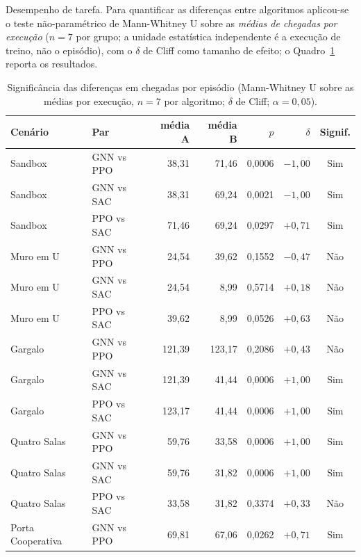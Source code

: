 \documentclass[12pt,reqno, twoside]{amsbook}
\makeatletter
\def\paragraph{\@startsection{paragraph}{4}%
  \z@\z@{-\fontdimen2\font}%
  {\normalfont\bfseries}}
\theoremstyle{plain}
\numberwithin{equation}{chapter}
\numberwithin{section}{chapter}
\numberwithin{table}{chapter}
\numberwithin{figure}{chapter}
\makeatother
\begin{document}
\paragraph{Desempenho de tarefa.} Para quantificar as diferenças entre algoritmos aplicou-se o teste não-paramétrico de Mann-Whitney U sobre as \emph{médias de chegadas por execução} ($n=7$ por grupo; a unidade estatística independente é a execução de treino, não o episódio), com o $\delta$ de Cliff como tamanho de efeito; o Quadro~\ref{tab:res_signif} reporta os resultados.

\begin{table}[!htbp]
\centering
\footnotesize
\caption[Significância das diferenças entre algoritmos]{Significância das diferenças em chegadas por episódio (Mann-Whitney U sobre as médias por execução, $n=7$ por algoritmo; $\delta$ de Cliff; $\alpha = 0{,}05$).}
\label{tab:res_signif}
\renewcommand{\arraystretch}{1.2}
\begin{tabular}{|l|l|r|r|r|r|c|}
\hline
Cenário & Par & média A & média B & $p$ & $\delta$ & Signif. \\
\hline
Sandbox & GNN vs PPO & 38,31 & 71,46 & 0,0006 & $-1{,}00$ & Sim \\
\hline
Sandbox & GNN vs SAC & 38,31 & 69,24 & 0,0021 & $-1{,}00$ & Sim \\
\hline
Sandbox & PPO vs SAC & 71,46 & 69,24 & 0,0297 & $+0{,}71$ & Sim \\
\hline
Muro em U & GNN vs PPO & 24,54 & 39,62 & 0,1552 & $-0{,}47$ & Não \\
\hline
Muro em U & GNN vs SAC & 24,54 & 8,99 & 0,5714 & $+0{,}18$ & Não \\
\hline
Muro em U & PPO vs SAC & 39,62 & 8,99 & 0,0526 & $+0{,}63$ & Não \\
\hline
Gargalo & GNN vs PPO & 121,39 & 123,17 & 0,2086 & $+0{,}43$ & Não \\
\hline
Gargalo & GNN vs SAC & 121,39 & 41,44 & 0,0006 & $+1{,}00$ & Sim \\
\hline
Gargalo & PPO vs SAC & 123,17 & 41,44 & 0,0006 & $+1{,}00$ & Sim \\
\hline
Quatro Salas & GNN vs PPO & 59,76 & 33,58 & 0,0006 & $+1{,}00$ & Sim \\
\hline
Quatro Salas & GNN vs SAC & 59,76 & 31,82 & 0,0006 & $+1{,}00$ & Sim \\
\hline
Quatro Salas & PPO vs SAC & 33,58 & 31,82 & 0,3374 & $+0{,}33$ & Não \\
\hline
Porta Cooperativa & GNN vs PPO & 69,81 & 67,06 & 0,0262 & $+0{,}71$ & Sim \\

\end{tabular}
\end{table}
\end{document}
